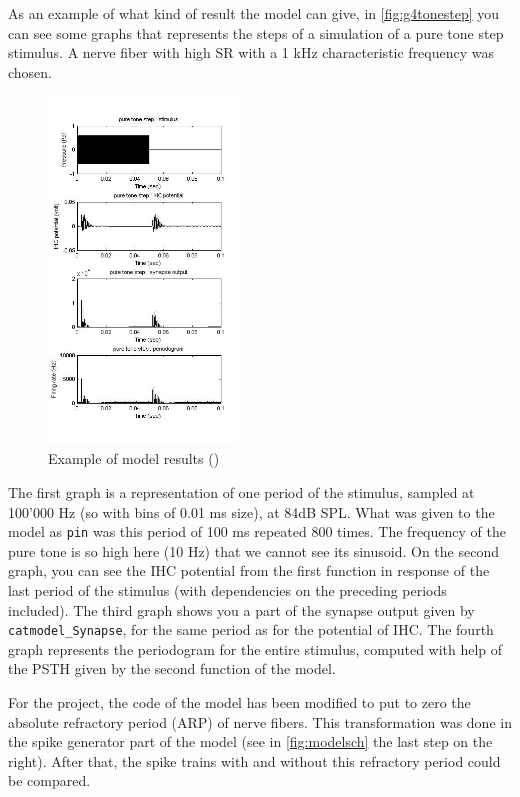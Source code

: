 As an example of what kind of result the model can give,
in \autoref{fig:g4tonestep} you can see some graphs that represents the steps of a 
simulation of a pure tone step stimulus.
A nerve fiber with high SR with a 1 kHz characteristic frequency 
was chosen.


\begin{figure}[h]
	\centering
	\includegraphics[width=0.45\textwidth]{images/g4-tonestep-column2.jpg}
	\caption{Example of model results (\cite{Model1})}
	\label{fig:g4tonestep}
\end{figure}


The first graph is a representation of one period of the stimulus, 
sampled at 100'000 Hz (so with bins of 0.01 ms size), at 84dB SPL.
What was given to the model as \texttt{pin} was this period of 100 ms repeated 800
times. The frequency of the pure tone is so high here (10 Hz) that we cannot see its sinusoid.
On the second graph, you can see the IHC potential from the first function
in response of the last period of the stimulus 
(with dependencies on the preceding periods included).
The third graph shows you a part of the synapse output given by \texttt{catmodel\_Synapse}, 
for the same period as for the potential of IHC.
The fourth graph represents the periodogram for the entire stimulus, 
computed with help of the PSTH given by the second function of the model.

For the project, the code of the model has been modified to put to zero 
the absolute refractory period (ARP) of nerve fibers. 
This transformation was done in the spike generator 
part of the model (see in \autoref{fig:modelsch} the last step on the right).
After that, the spike trains with and without this refractory period could be compared.

